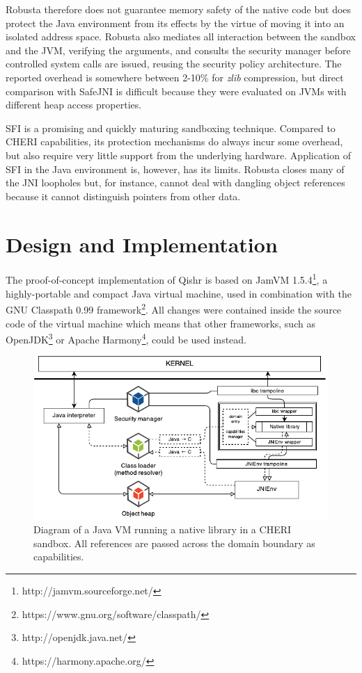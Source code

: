 \documentclass[a4paper,12pt,twoside,openright]{report}
\begin{document}
Robusta therefore does not guarantee memory safety of the native code but does protect the Java environment from its effects by the virtue of moving it into an isolated address space. Robusta also mediates all interaction between the sandbox and the JVM, verifying the arguments, and consults the security manager before controlled system calls are issued, reusing the security policy architecture. The reported overhead is somewhere between 2-10\% for \emph{zlib} compression, but direct comparison with SafeJNI is difficult because they were evaluated on JVMs with different heap access properties.

\label{sec:Robusta}
SFI is a promising and quickly maturing sandboxing technique. Compared to CHERI capabilities, its protection mechanisms do always incur some overhead, but also require very little support from the underlying hardware. Application of SFI in the Java environment is, however, has its limits. Robusta closes many of the JNI loopholes but, for instance, cannot deal with dangling object references because it cannot distinguish pointers from other data.

\chapter{Design and Implementation} 

The proof-of-concept implementation of Qishr is based on JamVM 1.5.4\footnote{http://jamvm.sourceforge.net/}, a highly-portable and compact Java virtual machine, used in combination with the GNU Classpath 0.99 framework\footnote{https://www.gnu.org/software/classpath/}. All changes were contained inside the source code of the virtual machine which means that other frameworks, such as OpenJDK\footnote{http://openjdk.java.net/} or Apache Harmony\footnote{https://harmony.apache.org/}, could be used instead.

\begin{figure}
	\includegraphics[width=\textwidth]{dia_jni_caps.pdf}
	\caption{Diagram of a Java VM running a native library in a CHERI sandbox. All references are passed across the domain boundary as capabilities.}
	\label{fig:OverviewCheriJNI}
\end{figure}
\end{document}
